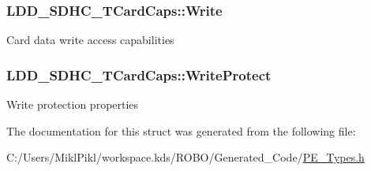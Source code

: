 \subsubsection[{Write}]{ L\+D\+D\+\_\+\+S\+D\+H\+C\+\_\+\+T\+Card\+Caps\+::\+Write}\label{struct_l_d_d___s_d_h_c___t_card_caps_ad28c378a6b9edfbd726a8019d5c8be79}
Card data write access capabilities \hypertarget{struct_l_d_d___s_d_h_c___t_card_caps_a32ecbbace3b435b1d70a57b09bf9662b}{}
\subsubsection[{Write\+Protect}]{ L\+D\+D\+\_\+\+S\+D\+H\+C\+\_\+\+T\+Card\+Caps\+::\+Write\+Protect}\label{struct_l_d_d___s_d_h_c___t_card_caps_a32ecbbace3b435b1d70a57b09bf9662b}
Write protection properties 

The documentation for this struct was generated from the following file\+:\begin{DoxyCompactItemize}
\item 
C\+:/\+Users/\+Mikl\+Pikl/workspace.\+kds/\+R\+O\+B\+O/\+Generated\+\_\+\+Code/\hyperlink{_p_e___types_8h}{P\+E\+\_\+\+Types.\+h}\end{DoxyCompactItemize}
